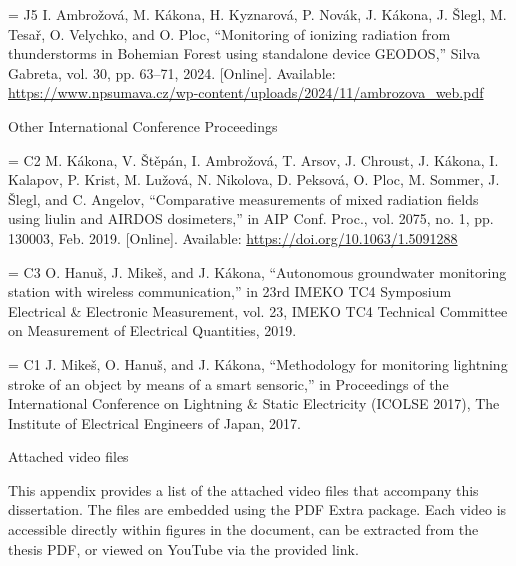 \bib[j5] = {J5} I. Ambrožová, M. Kákona, H. Kyznarová, P. Novák, J. Kákona, J. Šlegl, M. Tesař, O. Velychko, and O. Ploc, “Monitoring of ionizing radiation from thunderstorms in Bohemian Forest using standalone device GEODOS,” Silva Gabreta, vol. 30, pp. 63–71, 2024. [Online]. Available: \url{https://www.npsumava.cz/wp-content/uploads/2024/11/ambrozova_web.pdf}

\secc Other International Conference Proceedings

\bib[c2] = {C2} M. Kákona, V. Štěpán, I. Ambrožová, T. Arsov, J. Chroust, J. Kákona, I. Kalapov, P. Krist, M. Lužová, N. Nikolova, D. Peksová, O. Ploc, M. Sommer, J. Šlegl, and C. Angelov, “Comparative measurements of mixed radiation fields using liulin and AIRDOS dosimeters,” in AIP Conf. Proc., vol. 2075, no. 1, pp. 130003, Feb. 2019. [Online]. Available: \url{https://doi.org/10.1063/1.5091288}

\bib[c3] = {C3} O. Hanuš, J. Mikeš, and J. Kákona, “Autonomous groundwater monitoring station with wireless communication,” in 23rd IMEKO TC4 Symposium Electrical \& Electronic Measurement, vol. 23, IMEKO TC4 Technical Committee on Measurement of Electrical Quantities, 2019.

\bib[c1] = {C1} J. Mikeš, O. Hanuš, and J. Kákona, “Methodology for monitoring lightning stroke of an object by means of a smart sensoric,” in Proceedings of the International Conference on Lightning \& Static Electricity (ICOLSE 2017), The Institute of Electrical Engineers of Japan, 2017.

 Attached video files

This appendix provides a list of the attached video files that accompany this dissertation. The files are embedded using the PDF Extra package. Each video is accessible directly within figures in the document, can be extracted from the thesis PDF, or viewed on YouTube via the provided link.

